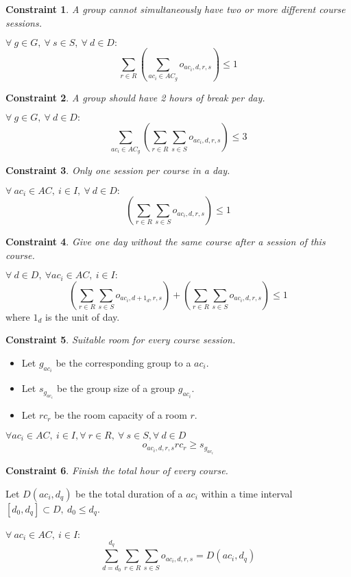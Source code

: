 \documentclass[12pt,a4paper]{article}
\newtheorem{theorem}{Constraint}
\begin{document}
\begin{theorem}
A group cannot simultaneously have two or more different course sessions.
\end{theorem}
$
\forall \ g \in G, \ \forall	\ s \in S, \ \forall \ d \in D :
$
\begin{equation}
\sum_{r\in R}\left(\sum_{ac_i \in AC_g}{o_{ac_{i}, d, r, s}}\right) \leq 1
\end{equation}
\begin{theorem}
A group should have 2 hours of break per day.
\end{theorem}
$
\forall \ g \in G, \ \forall \ d \in D :
$
\begin{equation}
\sum_{ac_{i} \in AC_{g}}\left(\sum_{r\in R}{\sum_{s \in S}{o_{ac_{i}, d, r, s}}}\right) \leq 3
\end{equation}
\begin{theorem}
Only one session per course in a day.
\end{theorem}
$
\forall \ ac_i \in AC,\ i \in I, \ \forall \ d \in D :
$
\begin{equation}
\left(\sum_{r\in R}{\sum_{s \in S}{o_{ac_{i}, d, r, s}}}\right) \leq 1
\end{equation}
\begin{theorem}
Give one day without the same course after a session of this course.
\end{theorem}
$
\forall \ d \in D, \ \forall ac_i \in AC, \ i \in I:
$
\begin{equation}
\left(\sum_{r\in R}{\sum_{s \in S}{o_{ac_{i}, d + 1_d, r, s}}}\right) + \left(\sum_{r\in R}{\sum_{s \in S}{o_{ac_{i}, d, r, s}}}\right) \leq 1
\end{equation}
where $1_d$ is the unit of day.

\begin{theorem}
Suitable room for every course session.
\end{theorem}

\begin{itemize}
	\item Let $g_{ac_{i}}$ be the corresponding group to a ${ac_{i}}$.
	\item Let $s_{g_{ac_{i}}}$ be the group size of a group $g_{ac_{i}}$.
	\item Let $rc_r$ be the room capacity of a room $r$.
\end{itemize}

$
\forall ac_i \in AC, \ i \in I, \forall \ r \in R, \ \forall \ s \in S, \forall \ d \in D 
$
\begin{equation}
o_{ac_i, d, r, s}rc_r \geq  s_{g_{ac_{i}}}
\end{equation}

\begin{theorem}
Finish the total hour of every course.
\end{theorem}
Let $D(ac_i, d_q)$ be the total duration of a $ac_i$ within a time interval $\left[d_0, d_q\right] \subset D, \ d_0 \leq d_q$. \\ \\
$
\forall \ ac_{i} \in AC, \ i \in I :
$ \\
\begin{equation}
\sum_{d = d_0 }^{d_q}\sum_{r \in R}\sum_{s \in S} {o_{ac_{i}, d, r, s}} = D(ac_{i}, d_q)
\end{equation}
\end{document}
